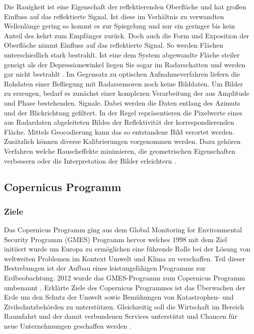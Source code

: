 Die Rauigkeit ist eine Eigenschaft der reflektierenden Oberfläche und hat großen Einfluss auf das reflektierte Signal. Ist diese im Verhältnis zu verwandten
Wellenlänge gering so kommt es zur Spiegelung und nur ein geringer bis kein Anteil des kehrt zum Empfänger zurück. Doch auch die Form und Exposition der Oberfläche nimmt 
Einfluss auf das reflektierte Signal. So werden Flächen unterschiedlich stark bestrahlt. Ist eine dem System abgewandte Fläche steiler geneigt als der Depressionswinkel 
liegen Sie sogar im Radarschatten und werden gar nicht bestrahlt \cite{einfuehrung_in_fernerkundung}. Im Gegensatz zu optischen Aufnahmeverfahren liefern die Rohdaten 
einer Befliegung mit Radarsensoren noch keine Bilddaten. Um Bilder zu erzeugen, bedarf es zunächst einer komplexen Verarbeitung der aus Amplitude und Phase bestehenden. 
Signale. Dabei werden die Daten entlang des Azimuts und der Blickrichtung gefiltert. In der Regel repräsentieren die Pixelwerte eines aus Radardaten abgeleiteten Bildes 
der Reflektivität der korrespondierenden Fläche. Mittels Geocodierung kann das so entstandene Bild verortet werden. Zusätzlich können diverse Kalibrierungen vorgenommen 
werden. Dazu gehören Verfahren welche Rauscheffekte minimieren, die geometrischen Eigenschaften verbessern oder die Interpretation der Bilder erleichtern \cite{tutorial_on_sar}. 

\subsection{Copernicus Programm}
\subsubsection{Ziele}
Das Copernicus Programm ging aus dem Global Monitoring for Environmental Security Programm (GMES) Programm hervor welches 1998 mit dem Ziel initiiert wurde um Europa 
zu ermöglichen eine führende Rolle bei der Lösung von weltweiten Problemen im Kontext Umwelt und Klima zu verschaffen. Teil dieser Bestrebungen ist der Aufbau eines 
leistungsfähigen Programms zur Erdbeobachtung. 2012 wurde das GMES-Programm zum Copernicus Programm umbenannt \cite{history_of_copernicus}.
Erklärte Ziele des Copernicus Programmes ist das Überwachen der Erde um den Schutz der Umwelt sowie Bemühungen von Katastrophen- und Zivilschutzbehörden zu 
unterstützen. Gleichzeitig soll die Wirtschaft im Bereich Raumfahrt und der damit verbundenen Services unterstützt und Chancen für neue Unternehmungen geschaffen
werden \cite{copernicus_regulation}.

